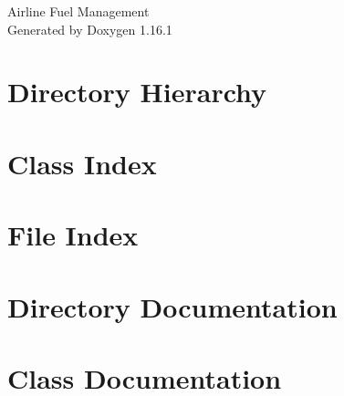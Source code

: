 \documentclass[twoside]{book}
\newcommand{\+}{\discretionary{\mbox{\scriptsize$\hookleftarrow$}}{}{}}
\newcommand{\clearemptydoublepage}{%
    \newpage{\pagestyle{empty}\cleardoublepage}%
  }
\begin{document}
  \raggedbottom
    \hypersetup{pageanchor=false,
                bookmarksnumbered=true,
                pdfencoding=unicode
               }
  \begin{titlepage}
  \vspace*{7cm}
  \begin{center}%
  {\Large Airline Fuel Management}\\
  \vspace*{1cm}
  {\large Generated by Doxygen 1.16.1}\\
  \end{center}
  \end{titlepage}
  \clearemptydoublepage
  \tableofcontents
  \clearemptydoublepage
  \hypersetup{pageanchor=true}
\chapter{Directory Hierarchy}

\chapter{Class Index}

\chapter{File Index}

\chapter{Directory Documentation}




\chapter{Class Documentation}












\end{document}
